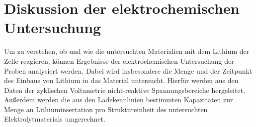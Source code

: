 \documentclass[a4paper, 11pt, headsepline,footsepline,twoside,abstract]{scrbook}
\begin{document}
\section{Diskussion der elektrochemischen Untersuchung}
Um zu verstehen, ob und wie die untersuchten Materialien mit dem Lithium der Zelle reagieren, können Ergebnisse der elektrochemischen Untersuchung der Proben analysiert werden. Dabei wird insbesondere die Menge und der Zeitpunkt des Einbaus von Lithium in das Material untersucht. Hierfür werden aus den Daten der zyklischen Voltametrie nicht-reaktive Spannungsbereiche hergeleitet. Außerdem werden die aus den Ladekennlinien bestimmten Kapazitäten zur Menge an Lithiuminsertation pro Struktureinheit des untersuchten Elektrolytmaterials umgerechnet. %
\end{document}
